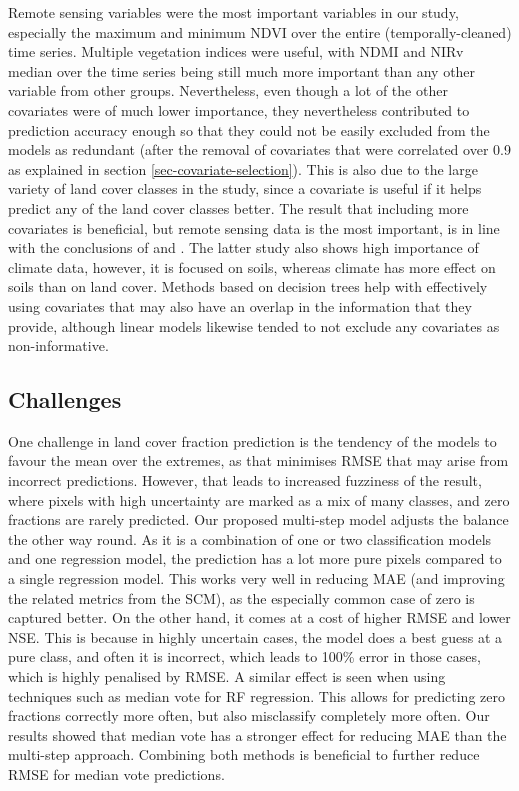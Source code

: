 \documentclass[a4paper,10pt]{article}
\begin{document}
Remote sensing variables were the most important variables in our study, especially the maximum and minimum \gls{NDVI} over the entire (temporally-cleaned) time series.
Multiple vegetation indices were useful, with \gls{NDMI} and \gls{NIRv} median over the time series being still much more important than any other variable from other groups.
Nevertheless, even though a lot of the other covariates were of much lower importance, they nevertheless contributed to prediction accuracy enough so that they could not be easily excluded from the models as redundant (after the removal of covariates that were correlated over 0.9 as explained in section \ref{sec-covariate-selection}).
This is also due to the large variety of land cover classes in the study, since a covariate is useful if it helps predict any of the land cover classes better.
The result that including more covariates is beneficial, but remote sensing data is the most important, is in line with the conclusions of \citet{li_monitoring_2018} and \citet{hengl_soilgrids250m_2017}.
The latter study also shows high importance of climate data, however, it is focused on soils, whereas climate has more effect on soils than on land cover.
Methods based on decision trees help with effectively using covariates that may also have an overlap in the information that they provide, although linear models likewise tended to not exclude any covariates as non-informative.

\subsection{Challenges}

One challenge in land cover fraction prediction is the tendency of the models to favour the mean over the extremes, as that minimises \gls{RMSE} that may arise from incorrect predictions.
However, that leads to increased fuzziness of the result, where pixels with high uncertainty are marked as a mix of many classes, and zero fractions are rarely predicted.
Our proposed multi-step model adjusts the balance the other way round.
As it is a combination of one or two classification models and one regression model, the prediction has a lot more pure pixels compared to a single regression model.
This works very well in reducing \gls{MAE} (and improving the related metrics from the \gls{SCM}), as the especially common case of zero is captured better.
On the other hand, it comes at a cost of higher \gls{RMSE} and lower \gls{NSE}.
This is because in highly uncertain cases, the model does a best guess at a pure class, and often it is incorrect, which leads to 100\% error in those cases, which is highly penalised by \gls{RMSE}.
A similar effect is seen when using techniques such as median vote for \gls{RF} regression.
This allows for predicting zero fractions correctly more often, but also misclassify completely more often.
Our results showed that median vote has a stronger effect for reducing \gls{MAE} than the multi-step approach.
Combining both methods is beneficial to further reduce \gls{RMSE} for median vote predictions.
\end{document}

